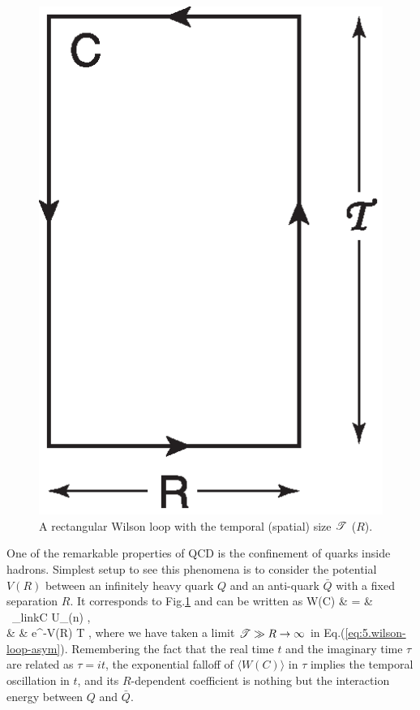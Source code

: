 \begin{figure}[t]
\begin{center}
\includegraphics[scale=0.55]{Chapter3-figures/wilson-L.eps}
 \end{center}
\caption{A rectangular  Wilson loop with the
 temporal (spatial) size ${\cal T}$ ($R$).}
\label{fig:wilson-L}
\end{figure}

One of the remarkable properties of QCD is the   confinement of quarks inside 
hadrons.  Simplest setup to see this phenomena is to consider
the potential $V(R)$ between  an infinitely heavy quark $Q$ and an anti-quark $\bar{Q}$ with
a fixed separation $R$.
It corresponds to Fig.\ref{fig:wilson-L} and can be written as
\beq
 \label{eq:5.wilson-loop-lattice}
\langle W(C) \rangle  
 & = & \ \prod_{{\rm link}\in C}  U_{\mu}(n) \rangle , \\
 \label{eq:5.wilson-loop-asym}
 & \propto  & 
  {\rm e}^{-V(R) {\cal T} } \simeq 
 \exp {} ,
\eeq  
where we  have taken a limit     
${\cal T} \gg R \rightarrow \infty$ in   Eq.(\ref{eq:5.wilson-loop-asym}).
 Remembering the fact that the real time $t$ and the imaginary time $\tau$ are
 related as  $\tau=it$, the exponential falloff of  $\langle W(C) \rangle$ in $\tau$ implies the 
  temporal oscillation in $t$, and its $R$-dependent coefficient is nothing but the 
 interaction  energy between $Q$ and $\bar{Q}$.  
 
